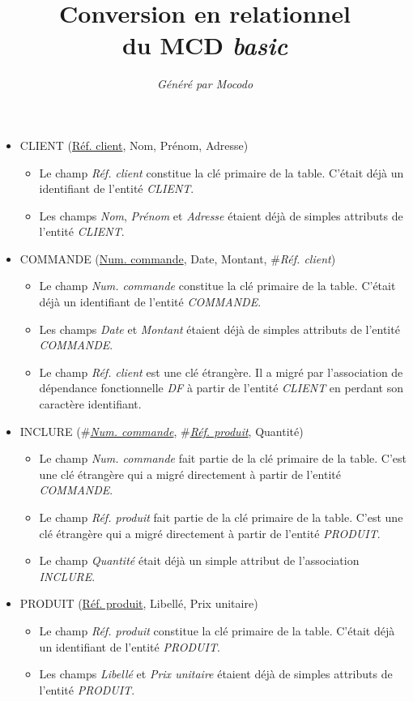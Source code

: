 \documentclass[a4paper]{article}
\title{Conversion en relationnel\\du MCD \emph{basic}}
\author{\emph{Généré par Mocodo}}
\newcommand{\relat}[1]{\textsc{#1}}
\newcommand{\attr}[1]{#1}
\newcommand{\prim}[1]{\uline{#1}}
\newcommand{\foreign}[1]{\#\textsl{#1}}
\begin{document}
\maketitle

\begin{itemize}
  \item \relat{CLIENT} (\prim{Réf. client}, \attr{Nom}, \attr{Prénom}, \attr{Adresse})
  \begin{itemize}
    \item Le champ \emph{Réf. client} constitue la clé primaire de la table. C'était déjà un identifiant de l'entité \emph{CLIENT}.
    \item Les champs \emph{Nom}, \emph{Prénom} et \emph{Adresse} étaient déjà de simples attributs de l'entité \emph{CLIENT}.
  \end{itemize}

  \item \relat{COMMANDE} (\prim{Num. commande}, \attr{Date}, \attr{Montant}, \foreign{Réf. client})
  \begin{itemize}
    \item Le champ \emph{Num. commande} constitue la clé primaire de la table. C'était déjà un identifiant de l'entité \emph{COMMANDE}.
    \item Les champs \emph{Date} et \emph{Montant} étaient déjà de simples attributs de l'entité \emph{COMMANDE}.
    \item Le champ \emph{Réf. client} est une clé étrangère. Il a migré par l'association de dépendance fonctionnelle \emph{DF} à partir de l'entité \emph{CLIENT} en perdant son caractère identifiant.
  \end{itemize}

  \item \relat{INCLURE} (\foreign{\prim{Num. commande}}, \foreign{\prim{Réf. produit}}, \attr{Quantité})
  \begin{itemize}
    \item Le champ \emph{Num. commande} fait partie de la clé primaire de la table. C'est une clé étrangère qui a migré directement à partir de l'entité \emph{COMMANDE}.
    \item Le champ \emph{Réf. produit} fait partie de la clé primaire de la table. C'est une clé étrangère qui a migré directement à partir de l'entité \emph{PRODUIT}.
    \item Le champ \emph{Quantité} était déjà un simple attribut de l'association \emph{INCLURE}.
  \end{itemize}

  \item \relat{PRODUIT} (\prim{Réf. produit}, \attr{Libellé}, \attr{Prix unitaire})
  \begin{itemize}
    \item Le champ \emph{Réf. produit} constitue la clé primaire de la table. C'était déjà un identifiant de l'entité \emph{PRODUIT}.
    \item Les champs \emph{Libellé} et \emph{Prix unitaire} étaient déjà de simples attributs de l'entité \emph{PRODUIT}.
  \end{itemize}

\end{itemize}
\end{document}
